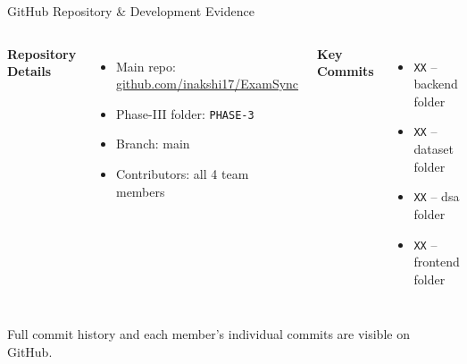 \documentclass[aspectratio=169,11pt]{beamer}
\newcommand{\smallnote}[1]{%
\vspace{0.08cm}
{\scriptsize\color{GEUGrey}#1}
}
\begin{document}
\begin{frame}{GitHub Repository \& Development Evidence}

\begin{columns}[T,totalwidth=\textwidth]


\textbf{\color{GEUBlue}Repository Details}

\begin{itemize}\itemsep3pt
    \small
    \item Main repo: {\scriptsize\url{github.com/inakshi17/ExamSync}}
    \item Phase-III folder: {\scriptsize\texttt{PHASE-3}}
    \item Branch: main
    \item Contributors: all 4 team members
\end{itemize}


\textbf{\color{GEUBlue}Key Commits}

\begin{itemize}\itemsep3pt
    \small
    \item \texttt{XX} -- backend folder
    \item \texttt{XX} -- dataset folder
    \item \texttt{XX} -- dsa folder
    \item \texttt{XX} -- frontend folder
\end{itemize}

\end{columns}

\vfill

\smallnote{
Full commit history and each member's individual commits are visible on GitHub.
}

\end{frame}
\end{document}
